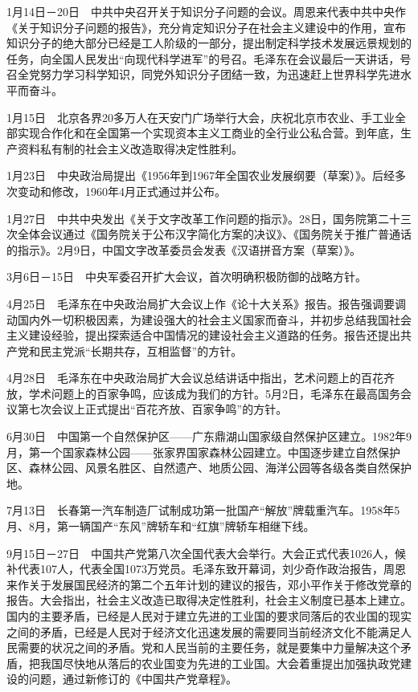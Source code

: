 \documentclass[10pt,a4paper,twocolumn]{book}
\begin{document}
1月14日－20日　中共中央召开关于知识分子问题的会议。周恩来代表中共中央作《关于知识分子问题的报告》，充分肯定知识分子在社会主义建设中的作用，宣布知识分子的绝大部分已经是工人阶级的一部分，提出制定科学技术发展远景规划的任务，向全国人民发出“向现代科学进军”的号召。毛泽东在会议最后一天讲话，号召全党努力学习科学知识，同党外知识分子团结一致，为迅速赶上世界科学先进水平而奋斗。

1月15日　北京各界20多万人在天安门广场举行大会，庆祝北京市农业、手工业全部实现合作化和在全国第一个实现资本主义工商业的全行业公私合营。到年底，生产资料私有制的社会主义改造取得决定性胜利。

1月23日　中央政治局提出《1956年到1967年全国农业发展纲要（草案）》。后经多次变动和修改，1960年4月正式通过并公布。

1月27日　中共中央发出《关于文字改革工作问题的指示》。28日，国务院第二十三次全体会议通过《国务院关于公布汉字简化方案的决议》、《国务院关于推广普通话的指示》。2月9日，中国文字改革委员会发表《汉语拼音方案（草案）》。

3月6日－15日　中央军委召开扩大会议，首次明确积极防御的战略方针。

4月25日　毛泽东在中央政治局扩大会议上作《论十大关系》报告。报告强调要调动国内外一切积极因素，为建设强大的社会主义国家而奋斗，并初步总结我国社会主义建设经验，提出探索适合中国情况的建设社会主义道路的任务。报告还提出共产党和民主党派“长期共存，互相监督”的方针。

4月28日　毛泽东在中央政治局扩大会议总结讲话中指出，艺术问题上的百花齐放，学术问题上的百家争鸣，应该成为我们的方针。5月2日，毛泽东在最高国务会议第七次会议上正式提出“百花齐放、百家争鸣”的方针。

6月30日　中国第一个自然保护区——广东鼎湖山国家级自然保护区建立。1982年9月，第一个国家森林公园——张家界国家森林公园建立。中国逐步建立自然保护区、森林公园、风景名胜区、自然遗产、地质公园、海洋公园等各级各类自然保护地。

7月13日　长春第一汽车制造厂试制成功第一批国产“解放”牌载重汽车。1958年5月、8月，第一辆国产“东风”牌轿车和“红旗”牌轿车相继下线。

9月15日－27日　中国共产党第八次全国代表大会举行。大会正式代表1026人，候补代表107人，代表全国1073万党员。毛泽东致开幕词，刘少奇作政治报告，周恩来作关于发展国民经济的第二个五年计划的建议的报告，邓小平作关于修改党章的报告。大会指出，社会主义改造已取得决定性胜利，社会主义制度已基本上建立。国内的主要矛盾，已经是人民对于建立先进的工业国的要求同落后的农业国的现实之间的矛盾，已经是人民对于经济文化迅速发展的需要同当前经济文化不能满足人民需要的状况之间的矛盾。党和人民当前的主要任务，就是要集中力量解决这个矛盾，把我国尽快地从落后的农业国变为先进的工业国。大会着重提出加强执政党建设的问题，通过新修订的《中国共产党章程》。
\end{document}

